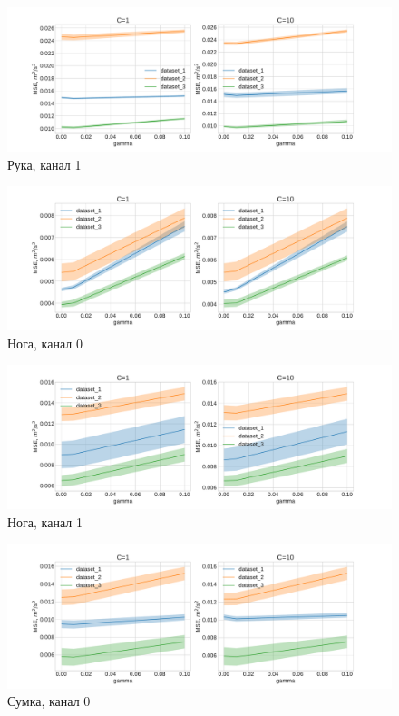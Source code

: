 \documentclass[letterpaper, 10 pt, conference]{ieeeconf}  %
\begin{document}
    \begin{figure}[H]
    \includegraphics[scale=0.2]{charts/handheld_chn1_C=10.pdf}
    \caption{Рука, канал 1}
    \label{fig:image}
    \end{figure}
    
    \begin{figure}[H]
    \includegraphics[scale=0.2]{charts/leg_chn0_C=10.pdf}
    \caption{Нога, канал 0}
    \label{fig:image}
    \end{figure}
    
    \begin{figure}[H]
    \includegraphics[scale=0.2]{charts/leg_chn1_C=10.pdf}
    \caption{Нога, канал 1}
    \label{fig:image}
    \end{figure}
    
    \begin{figure}[H]
    \includegraphics[scale=0.2]{charts/bag_chn0_C=10.pdf}
    \caption{Сумка, канал 0}
    \label{fig:image}
    \end{figure}
    
\end{document}

